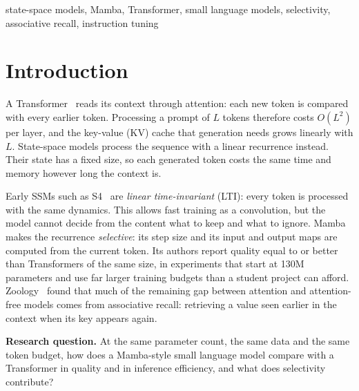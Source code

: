 \documentclass[conference]{IEEEtran}
\begin{document}
\begin{IEEEkeywords}
state-space models, Mamba, Transformer, small language models, selectivity, associative recall,
instruction tuning
\end{IEEEkeywords}

\section{Introduction}

A Transformer~\cite{vaswani2017attention} reads its context through attention: each new token is
compared with every earlier token. Processing a prompt of $L$ tokens therefore costs $O(L^2)$ per
layer, and the key-value (KV) cache that generation needs grows linearly with $L$. State-space models
process the sequence with a linear recurrence instead. Their state has a fixed size, so each generated
token costs the same time and memory however long the context is.

Early SSMs such as S4~\cite{gu2022s4} are \emph{linear time-invariant} (LTI): every token is processed
with the same dynamics. This allows fast training as a convolution, but the model cannot decide from
the content what to keep and what to ignore. Mamba~\cite{gu2023mamba} makes the recurrence
\emph{selective}: its step size and its input and output maps are computed from the current token. Its
authors report quality equal to or better than Transformers of the same size, in experiments that
start at 130M parameters and use far larger training budgets than a student project can afford.
Zoology~\cite{arora2023zoology} found that much of the remaining gap between attention and
attention-free models comes from associative recall: retrieving a value seen earlier in the context
when its key appears again.

\textbf{Research question.} At the same parameter count, the same data and the same token budget, how
does a Mamba-style small language model compare with a Transformer in quality and in inference
efficiency, and what does selectivity contribute?
\end{document}
